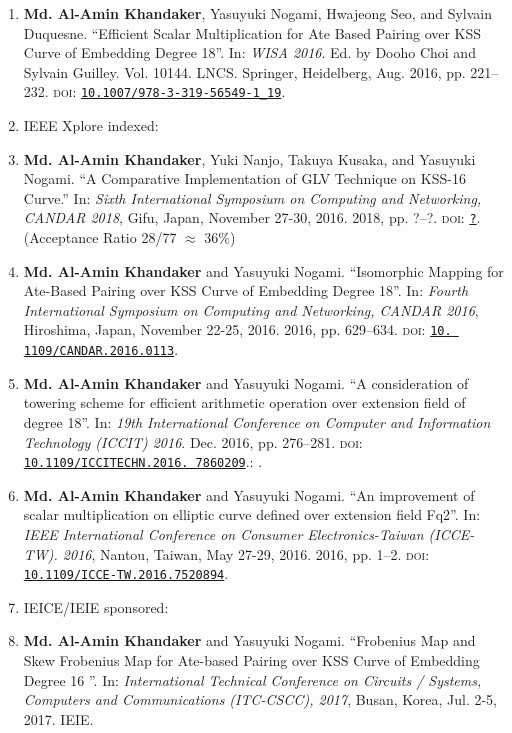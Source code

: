 \begin{itemize}
\begin{enumerate}
	\item \textbf{Md. Al-Amin Khandaker}, Yasuyuki Nogami, Hwajeong Seo, and Sylvain Duquesne. ``Efficient Scalar Multiplication for Ate Based Pairing over KSS Curve of Embedding Degree 18''. In: \textit{WISA 2016}. Ed. by Dooho Choi and Sylvain Guilley. Vol. 10144. LNCS. Springer, Heidelberg, Aug. 2016, pp. 221–232. \textsc{doi}: \href{https://doi.org/10.1007/978-3-319-56549-1\_19}{\texttt{10.1007/978-3-319-56549-1\_19}}.

	\vspace{5mm}
	\item[ ] \Large IEEE Xplore indexed:
	\normalsize
	\item \textbf{Md. Al-Amin Khandaker}, Yuki Nanjo, Takuya Kusaka, and Yasuyuki Nogami. ``A Comparative Implementation of GLV Technique on KSS-16 Curve.'' In:  \textit{Sixth International Symposium on Computing and Networking, CANDAR 2018}, Gifu, Japan, November 27-30, 2016. 2018, pp. ?–?. \textsc{doi}: \href{_}{\texttt{?}}. (Acceptance Ratio 28/77 $\approx$ 36\%)
	
	\item \textbf{Md. Al-Amin Khandaker} and Yasuyuki Nogami. “Isomorphic Mapping for Ate-Based Pairing over KSS Curve of Embedding Degree 18”. In: \textit{Fourth International Symposium on Computing and Networking, CANDAR 2016}, Hiroshima, Japan, November 22-25, 2016. 2016, pp. 629–634. \textsc{doi}: \href{https://doi.org/10. 1109/CANDAR.2016.0113}{\texttt{10. 1109/CANDAR.2016.0113}}.
	
	\item  \textbf{Md. Al-Amin Khandaker} and Yasuyuki Nogami. ``A consideration of towering scheme for efficient arithmetic operation over extension field of degree 18''. In: \textit{19th International Conference on Computer and Information Technology (ICCIT) 2016}. Dec. 2016, pp. 276–281. \textsc{doi}: \href{https://doi.org/10.1109/ICCITECHN.2016.7860209}{\texttt{10.1109/ICCITECHN.2016. 7860209}}.: .
	
	\item \textbf{Md. Al-Amin Khandaker} and Yasuyuki Nogami. ``An improvement of scalar multiplication on elliptic curve defined over extension field Fq2''. In: \textit{IEEE International Conference on Consumer Electronics-Taiwan (ICCE- TW). 2016}, Nantou, Taiwan, May 27-29, 2016. 2016, pp. 1–2. \textsc{doi}: \href{https://doi.org/10.1109/ICCE-TW.2016.7520894}{\texttt{10.1109/ICCE-TW.2016.7520894}}.
	
	\vspace{5mm}
	\item[ ] \Large IEICE/IEIE sponsored:
	\normalsize
	\item \textbf{Md. Al-Amin Khandaker} and Yasuyuki Nogami. ``Frobenius Map and Skew Frobenius Map for Ate-based Pairing over KSS Curve of Embedding Degree 16 ''. In: \textit{International Technical Conference on Circuits / Systems, Computers and Communications (ITC-CSCC), 2017},  Busan, Korea, Jul. 2-5, 2017. IEIE.
\end{enumerate}



\end{itemize}
